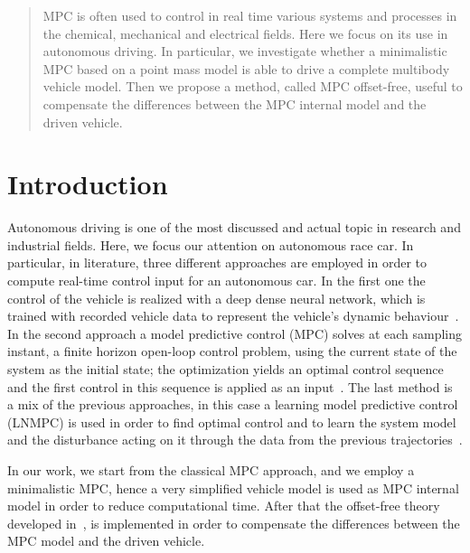 \documentclass[conference]{IEEEtran} %
\begin{document}

\begin{abstract}
	MPC is often used to control in real time various systems and processes in the
	chemical, mechanical and electrical fields. Here we focus on its use in autonomous
	driving. In particular, we investigate whether a minimalistic MPC based on a
	point mass model is able to drive a complete multibody vehicle model.
	Then we propose a method, called MPC offset-free, useful to compensate
	the differences between the MPC internal model and the driven vehicle.
\end{abstract}

\IEEEpeerreviewmaketitle

\section{Introduction}
Autonomous driving is one of the most discussed and actual topic in research and industrial fields. Here, we focus our attention on autonomous race car. In particular, in literature, three different approaches are employed in order to compute real-time control input for an autonomous car.
In the first one the control of the vehicle is realized with a deep dense neural network, which is trained with recorded vehicle data to represent the vehicle's dynamic behaviour~\cite{Hermansdorfer2020, Zhu2018, Navarro2018}. In the second approach a model predictive control (MPC) solves at each sampling instant, a finite horizon open-loop control problem, using the current state of the system as the initial state; the optimization yields an optimal control sequence and the first control in this sequence is applied as an input~\cite{Liniger2015, Novi2019, Verschueren2014}. The last method is a mix of the previous approaches, in this case a learning model predictive control (LNMPC) is used in order to find optimal control and
to learn the system model and the disturbance acting on it through the data from the previous trajectories~\cite{Rosolia2016, Brunner2017, Limon2017}.


In our work, we start from the classical MPC approach, and we employ a minimalistic MPC, hence a very simplified vehicle model is used as MPC internal model in order to reduce computational time.
After that the offset-free theory developed in~\cite{Pannocchia2015}, is implemented in order to compensate the differences between the MPC model and the driven vehicle.
\end{document}
